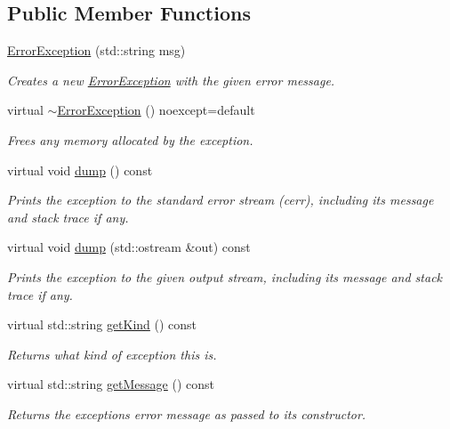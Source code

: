 \subsection*{Public Member Functions}
\begin{DoxyCompactItemize}
\item 
\mbox{\hyperlink{classErrorException_a4f422b01fff7cc16eea81e00638f44d2}{Error\+Exception}} (std\+::string msg)
\begin{DoxyCompactList}\small\item\em Creates a new \mbox{\hyperlink{classErrorException}{Error\+Exception}} with the given error message. \end{DoxyCompactList}\item 
virtual \mbox{\hyperlink{classErrorException_a61c8f6114a93ea2ff11a5f08e3640d76}{$\sim$\+Error\+Exception}} () noexcept=default
\begin{DoxyCompactList}\small\item\em Frees any memory allocated by the exception. \end{DoxyCompactList}\item 
virtual void \mbox{\hyperlink{classErrorException_af1e6a5fb477a95a876e86ceadf065ffd}{dump}} () const
\begin{DoxyCompactList}\small\item\em Prints the exception to the standard error stream (cerr), including its message and stack trace if any. \end{DoxyCompactList}\item 
virtual void \mbox{\hyperlink{classErrorException_a277bc85222ba9a7d0fd47fd10d44d115}{dump}} (std\+::ostream \&out) const
\begin{DoxyCompactList}\small\item\em Prints the exception to the given output stream, including its message and stack trace if any. \end{DoxyCompactList}\item 
virtual std\+::string \mbox{\hyperlink{classErrorException_ae6faf7d90a6394517c0328748c99ec1d}{get\+Kind}} () const
\begin{DoxyCompactList}\small\item\em Returns what kind of exception this is. \end{DoxyCompactList}\item 
virtual std\+::string \mbox{\hyperlink{classErrorException_a1c1cc72e6e4257dbd29ff04a23973008}{get\+Message}} () const
\begin{DoxyCompactList}\small\item\em Returns the exception\textquotesingle{}s error message as passed to its constructor. \end{DoxyCompactList}\item 

\end{DoxyCompactItemize}
